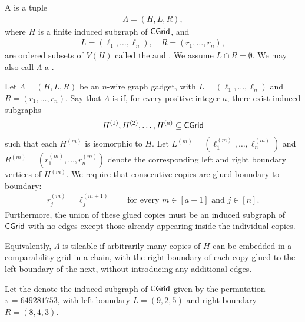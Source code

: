 \begin{definition}
\label{def:graph-gadget}
A  is a tuple
\begin{align}
    \Lambda=(H,L,R),
\end{align}
where $H$ is a finite induced subgraph of $\mathsf{CGrid}$, and
\begin{align}
    L=(\ell_1,\ldots,\ell_n),
    \quad
    R=(r_1,\ldots,r_n),
\end{align}
are ordered subsets of $V(H)$ called the  and
. We assume \(L\cap R=\emptyset\). We may also call $\Lambda$ a .
\end{definition}

\begin{definition}
\label{def:tileable-graph-gadget}
Let $\Lambda=(H,L,R)$ be an $n$-wire graph gadget, with
$L=(\ell_1,\ldots,\ell_n)$ and $R=(r_1,\ldots,r_n)$. Say that $\Lambda$ is
 if, for every positive integer $a$, there exist induced
subgraphs
\begin{align}
    H^{(1)},H^{(2)},\ldots,H^{(a)} \subseteq \mathsf{CGrid}
\end{align}
such that each $H^{(m)}$ is isomorphic to $H$. Let
$L^{(m)}=(\ell^{(m)}_1,\ldots,\ell^{(m)}_n)$ and
$R^{(m)}=(r^{(m)}_1,\ldots,r^{(m)}_n)$ denote the corresponding left and right
boundary vertices of $H^{(m)}$. We require that consecutive copies are glued
boundary-to-boundary:
\begin{align}
    r^{(m)}_j=\ell^{(m+1)}_j
    \qquad
    \text{for every } m\in[a-1] \text{ and } j\in[n].
\end{align}
Furthermore, the union of these glued copies must be an induced subgraph of
$\mathsf{CGrid}$ with no edges except those already appearing inside the individual
copies.
\end{definition}

Equivalently, \(\Lambda\) is tileable if arbitrarily many copies of \(H\)
can be embedded in a comparability grid in a chain, with the right boundary of
each copy glued to the left boundary of the next, without introducing any
additional edges.

\begin{definition}
Let the  denote the induced subgraph of $\mathsf{CGrid}$ given by the permutation $\pi=649281753$, with left boundary $L=(9,2,5)$ and right boundary $R=(8,4,3)$.
\end{definition}



